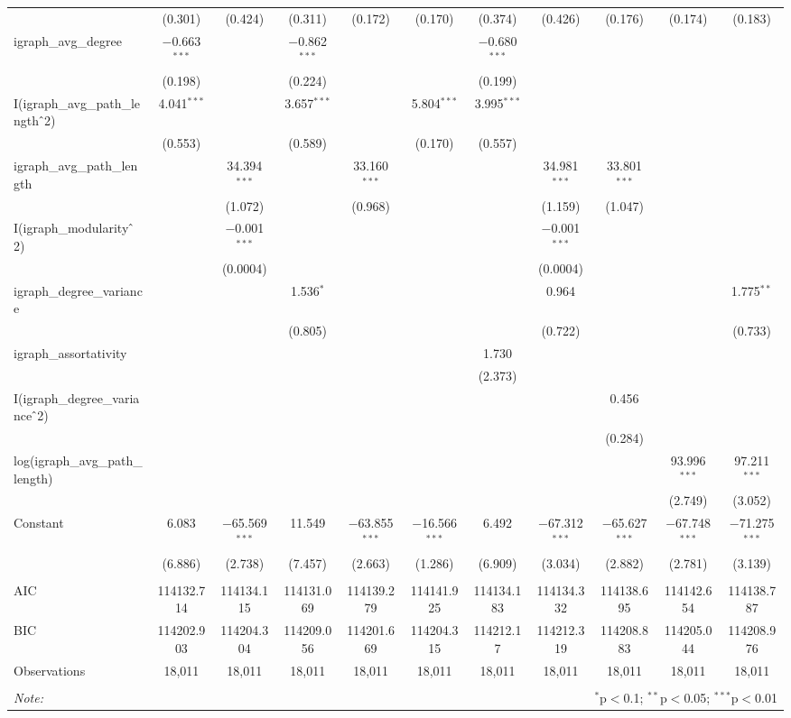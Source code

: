 \begin{table}[!htbp]
\begin{tabular}{@{\extracolsep{5pt}}lcccccccccc}
  & (0.301) & (0.424) & (0.311) & (0.172) & (0.170) & (0.374) & (0.426) & (0.176) & (0.174) & (0.183) \\ 
  igraph\_avg\_degree & $-$0.663$^{***}$ &  & $-$0.862$^{***}$ &  &  & $-$0.680$^{***}$ &  &  &  &  \\ 
  & (0.198) &  & (0.224) &  &  & (0.199) &  &  &  &  \\ 
  I(igraph\_avg\_path\_length$\hat{\mkern6mu}$2) & 4.041$^{***}$ &  & 3.657$^{***}$ &  & 5.804$^{***}$ & 3.995$^{***}$ &  &  &  &  \\ 
  & (0.553) &  & (0.589) &  & (0.170) & (0.557) &  &  &  &  \\ 
  igraph\_avg\_path\_length &  & 34.394$^{***}$ &  & 33.160$^{***}$ &  &  & 34.981$^{***}$ & 33.801$^{***}$ &  &  \\ 
  &  & (1.072) &  & (0.968) &  &  & (1.159) & (1.047) &  &  \\ 
  I(igraph\_modularity$\hat{\mkern6mu}$2) &  & $-$0.001$^{***}$ &  &  &  &  & $-$0.001$^{***}$ &  &  &  \\ 
  &  & (0.0004) &  &  &  &  & (0.0004) &  &  &  \\ 
  igraph\_degree\_variance &  &  & 1.536$^{*}$ &  &  &  & 0.964 &  &  & 1.775$^{**}$ \\ 
  &  &  & (0.805) &  &  &  & (0.722) &  &  & (0.733) \\ 
  igraph\_assortativity &  &  &  &  &  & 1.730 &  &  &  &  \\ 
  &  &  &  &  &  & (2.373) &  &  &  &  \\ 
  I(igraph\_degree\_variance$\hat{\mkern6mu}$2) &  &  &  &  &  &  &  & 0.456 &  &  \\ 
  &  &  &  &  &  &  &  & (0.284) &  &  \\ 
  log(igraph\_avg\_path\_length) &  &  &  &  &  &  &  &  & 93.996$^{***}$ & 97.211$^{***}$ \\ 
  &  &  &  &  &  &  &  &  & (2.749) & (3.052) \\ 
  Constant & 6.083 & $-$65.569$^{***}$ & 11.549 & $-$63.855$^{***}$ & $-$16.566$^{***}$ & 6.492 & $-$67.312$^{***}$ & $-$65.627$^{***}$ & $-$67.748$^{***}$ & $-$71.275$^{***}$ \\ 
  & (6.886) & (2.738) & (7.457) & (2.663) & (1.286) & (6.909) & (3.034) & (2.882) & (2.781) & (3.139) \\ 
 \hline \\[-1.8ex] 
AIC & 114132.714 & 114134.115 & 114131.069 & 114139.279 & 114141.925 & 114134.183 & 114134.332 & 114138.695 & 114142.654 & 114138.787 \\ 
BIC & 114202.903 & 114204.304 & 114209.056 & 114201.669 & 114204.315 & 114212.17 & 114212.319 & 114208.883 & 114205.044 & 114208.976 \\ 
Observations & 18,011 & 18,011 & 18,011 & 18,011 & 18,011 & 18,011 & 18,011 & 18,011 & 18,011 & 18,011 \\ 
\hline 
\hline \\[-1.8ex] 
\textit{Note:}  & \multicolumn{10}{r}{$^{*}$p$<$0.1; $^{**}$p$<$0.05; $^{***}$p$<$0.01} \\ 
\end{tabular} 
\end{table} 
